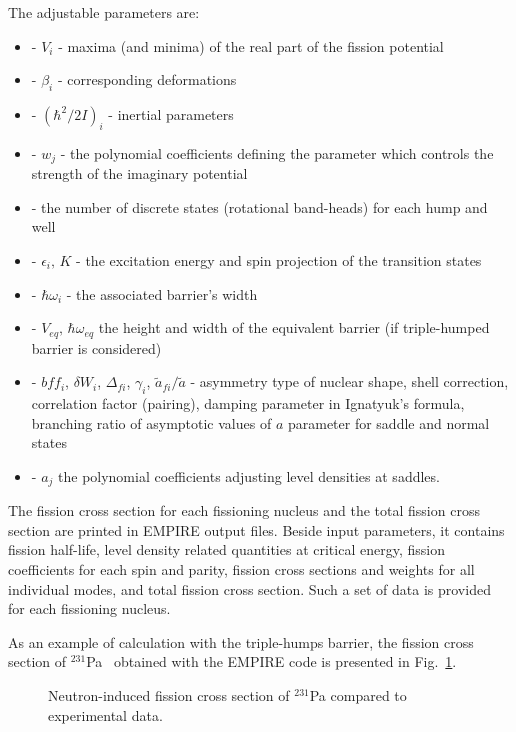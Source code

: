 \documentclass[twocolumn,amsmath,amssymb,10pt,groupedaddress,a4paper]{revtex4}
\begin{document}
The adjustable parameters are:
\begin{itemize}
\item - $V_{i}$ - maxima (and minima) of the real part of the fission potential
\item - $\beta_{i}$ - corresponding deformations
\item - $(\hbar^{2}/2I)_{i}$ - inertial parameters
\item - $w_{j}$ - the polynomial coefficients defining the parameter which
controls the strength of the imaginary potential
\item - the number of discrete states (rotational band-heads) for each hump
and well
\item - $\epsilon_{i},\, K$ - the excitation energy and spin projection
of the transition states
\item - $\hbar\omega_{i}$ - the associated barrier's width
\item - $V_{eq},\,\hbar\omega_{eq}$ the height and width of the equivalent
barrier (if triple-humped barrier is considered)
\item - $bff_{i}$, $\delta W_{i}$, $\Delta_{fi}$, $\gamma_{i}$, $\tilde{a}_{fi}/\tilde{a}$
- asymmetry type of nuclear shape, shell correction, correlation factor
(pairing), damping parameter in Ignatyuk's formula, branching ratio
of asymptotic values of $a$ parameter for saddle and normal states
\item - $a_{j}$ the polynomial coefficients adjusting level densities at
saddles.
\end{itemize}
The fission cross section for each fissioning nucleus and the total
fission cross section are printed in EMPIRE output files.
 Beside input parameters, it contains
fission half-life, level density related quantities at critical energy,
 fission coefficients for each spin and parity, fission
cross sections and weights for all individual modes, and total fission
cross section. Such a set of data is provided for each fissioning
nucleus.

As an example of calculation with the triple-humps barrier, the fission cross
section of $^{231}$Pa~\cite{sin01} obtained with the EMPIRE code is presented
in Fig.~\ref{pa231}.
\begin{figure}[htbp]
\caption{\label{pa231}Neutron-induced fission cross section of $^{231}$Pa compared to
experimental data.}
\end{figure}



\end{document}
